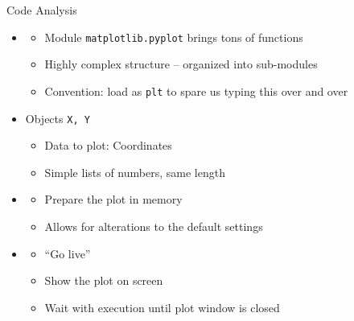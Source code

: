 \begin{frame}[fragile]{Code Analysis}
%
\begin{itemize}
\item {}
	\begin{itemize}
	\item Module \texttt{matplotlib.pyplot} brings tons of functions
	\item Highly complex structure -- organized into sub-modules
	\item Convention: load as \texttt{plt} to spare us typing this over and over
	\end{itemize}
\item Objects \texttt{X, Y}
	\begin{itemize}
	\item Data to plot: Coordinates
	\item Simple lists of numbers, same length
	\end{itemize}
\item {}
	\begin{itemize}
	\item Prepare the plot in memory
	\item Allows for alterations to the default settings
	\end{itemize}
\item {}
	\begin{itemize}
	\item \enquote{Go live}
	\item Show the plot on screen
	\item Wait with execution until plot window is closed
	\end{itemize}
\end{itemize}
%
\end{frame}


